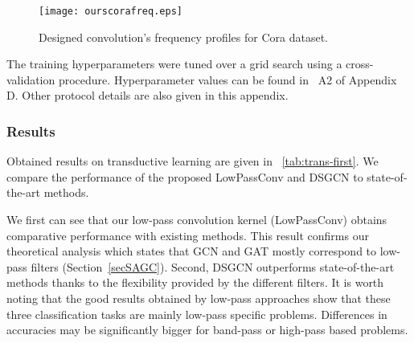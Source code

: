 \documentclass{article}
\begin{document}
\begin{figure}[!t]
\centering
\texttt{[image: ourscorafreq.eps]}
\caption{Designed convolution's frequency profiles for Cora dataset.}
\label{ourcorafreq}
\end{figure}

The training hyperparameters were tuned over a grid search using a cross-validation procedure. Hyperparameter values can be found in \tablename~A2 of Appendix D. Other protocol details are also given in this appendix.


\subsubsection{Results}
\label{sec:results}

Obtained results on transductive learning are given in \tablename~\ref{tab:trans-first}. We compare the performance of the proposed {LowPassConv} and {DSGCN} to state-of-the-art methods.

We first can see that our low-pass convolution kernel (LowPassConv)  obtains comparative performance with  existing methods. This result confirms our theoretical analysis which states that GCN and GAT mostly correspond to low-pass filters (Section~\ref{secSAGC}). Second, DSGCN outperforms state-of-the-art methods thanks to the flexibility  provided by the different filters. 
It is worth noting that the good results obtained by low-pass approaches show that these three classification tasks are mainly low-pass specific problems. Differences in accuracies may be significantly bigger for band-pass or high-pass based problems.
\end{document}
